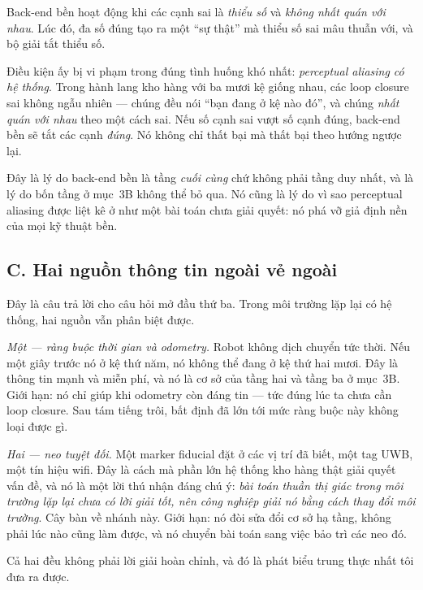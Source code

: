 \documentclass[../../vslam.tex]{subfiles}
\begin{document}
Back-end bền hoạt động khi các cạnh sai là \emph{thiểu số} và \emph{không nhất quán với nhau}. Lúc đó, đa số đúng tạo ra một ``sự thật'' mà thiểu số sai mâu thuẫn với, và bộ giải tắt thiểu số.

Điều kiện ấy bị vi phạm trong đúng tình huống khó nhất: \emph{perceptual aliasing có hệ thống}. Trong hành lang kho hàng với ba mươi kệ giống nhau, các loop closure sai không ngẫu nhiên --- chúng đều nói ``bạn đang ở kệ nào đó'', và chúng \emph{nhất quán với nhau} theo một cách sai. Nếu số cạnh sai vượt số cạnh đúng, back-end bền sẽ tắt các cạnh \emph{đúng}. Nó không chỉ thất bại mà thất bại theo hướng ngược lại.

Đây là lý do back-end bền là tầng \emph{cuối cùng} chứ không phải tầng duy nhất, và là lý do bốn tầng ở mục~3B không thể bỏ qua. Nó cũng là lý do vì sao perceptual aliasing được liệt kê ở  như một bài toán chưa giải quyết: nó phá vỡ giả định nền của mọi kỹ thuật bền.

\subsection{C. Hai nguồn thông tin ngoài vẻ ngoài}

Đây là câu trả lời cho câu hỏi mở đầu thứ ba. Trong môi trường lặp lại có hệ thống, hai nguồn vẫn phân biệt được.

\emph{Một --- ràng buộc thời gian và odometry.} Robot không dịch chuyển tức thời. Nếu một giây trước nó ở kệ thứ năm, nó không thể đang ở kệ thứ hai mươi. Đây là thông tin mạnh và miễn phí, và nó là cơ sở của tầng hai và tầng ba ở mục~3B. Giới hạn: nó chỉ giúp khi odometry còn đáng tin --- tức đúng lúc ta chưa cần loop closure. Sau tám tiếng trôi, bất định đã lớn tới mức ràng buộc này không loại được gì.

\emph{Hai --- neo tuyệt đối.} Một marker fiducial đặt ở các vị trí đã biết, một tag UWB, một tín hiệu wifi. Đây là cách mà phần lớn hệ thống kho hàng thật giải quyết vấn đề, và nó là một lời thú nhận đáng chú ý: \emph{bài toán thuần thị giác trong môi trường lặp lại chưa có lời giải tốt, nên công nghiệp giải nó bằng cách thay đổi môi trường}. Cây  bàn về nhánh này. Giới hạn: nó đòi sửa đổi cơ sở hạ tầng, không phải lúc nào cũng làm được, và nó chuyển bài toán sang việc bảo trì các neo đó.

Cả hai đều không phải lời giải hoàn chỉnh, và đó là phát biểu trung thực nhất tôi đưa ra được.
\end{document}
